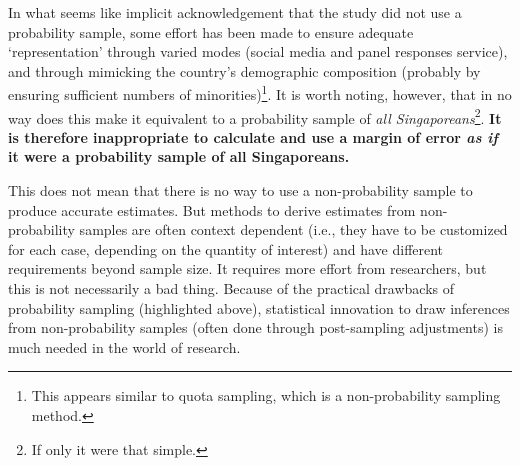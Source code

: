 \documentclass[
  openany]{book}
\begin{document}
In what seems like implicit acknowledgement that the study did not use a probability sample, some effort has been made to ensure adequate `representation' through varied modes (social media and panel responses service), and through mimicking the country's demographic composition (probably by ensuring sufficient numbers of minorities)\footnote{This appears similar to quota sampling, which is a non-probability sampling method.}. It is worth noting, however, that in no way does this make it equivalent to a probability sample of \emph{all Singaporeans}\footnote{If only it were that simple.}. \textbf{It is therefore inappropriate to calculate and use a margin of error \emph{as if} it were a probability sample of all Singaporeans.}

This does not mean that there is no way to use a non-probability sample to produce accurate estimates. But methods to derive estimates from non-probability samples are often context dependent (i.e., they have to be customized for each case, depending on the quantity of interest) and have different requirements beyond sample size. It requires more effort from researchers, but this is not necessarily a bad thing. Because of the practical drawbacks of probability sampling (highlighted above), statistical innovation to draw inferences from non-probability samples (often done through post-sampling adjustments) is much needed in the world of research.
\end{document}
